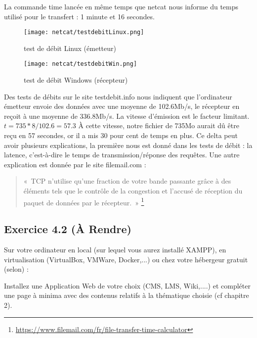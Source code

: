 \documentclass[11pt]{article}
\begin{document}
		La commande {\sffamily time} lancée en même temps que netcat nous informe du temps utilisé pour le transfert : 1 minute et 16 secondes. 
		
		\begin{figure}[!htb]
		\begin{minipage}{0.5\textwidth}
		\centering	  
	  \texttt{[image: netcat/testdebitLinux.png]}
	  \caption{test de débit Linux (émetteur)}
		\end{minipage} \hfill
		\begin{minipage}{0.5\textwidth}
		\centering	 
		\texttt{[image: netcat/testdebitWin.png]}
	  \caption{test de débit Windows (récepteur)}
		\end{minipage} 
	\end{figure}
	
	Des tests de débits sur le site testdebit.info nous indiquent que l’ordinateur émetteur envoie des données avec une moyenne de 102.6Mb/s, le récepteur en reçoit à une moyenne de 336.8Mb/s. La vitesse d’émission est le facteur limitant. $t = 735 * 8 / 102.6 = 57.3$ À cette vitesse, notre fichier de 735Mo aurait dû être reçu en 57 secondes, or il a mis 30 pour cent de temps en plus. Ce delta peut avoir plusieurs explications, la première nous est donné dans les tests de débit : la latence, c’est-à-dire le temps de transmission/réponse des requêtes. Une autre explication est donnée par le site filemail.com :
	
	\begin{quote}
	«~TCP n'utilise qu'une fraction de votre bande passante grâce à des éléments tels que le contrôle de la congestion et l'accusé de réception du paquet de données par le récepteur.~» \footnote{\url{https://www.filemail.com/fr/file-transfer-time-calculator}}
	\end{quote}

	\subsection*{Exercice 4.2 (À Rendre)}
	
	Sur votre ordinateur en local (sur lequel vous aurez installé XAMPP), en virtualisation (VirtualBox, VMWare, Docker,...) ou chez votre hébergeur gratuit (selon) :

Installez une Application Web de votre choix (CMS, LMS, Wiki,....) et compléter une page à minima avec des contenus relatifs à la thématique choisie (cf chapitre 2).
\end{document}
